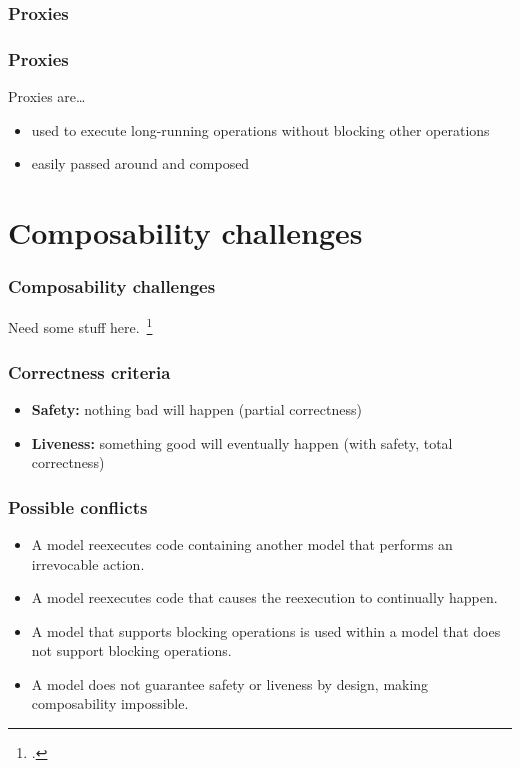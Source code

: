 \documentclass{beamer}
\begin{document}
  \begin{frame}
    \frametitle{Proxies}
  \end{frame}

  \begin{frame}
    \frametitle{Proxies}

    Proxies are\ldots

    \begin{itemize}
      \item used to execute long-running operations without blocking other operations
      \item easily passed around and composed
    \end{itemize}
  \end{frame}

  \section{Composability challenges}

  \begin{frame}
    \frametitle{Composability challenges}
    Need some stuff here.~\footcite{Swalens2014}
  \end{frame}

  \begin{frame}
    \frametitle{Correctness criteria}

    \begin{itemize}
      \item \textbf{Safety:} nothing bad will happen (partial correctness)
      \item \textbf{Liveness:} something good will eventually happen (with safety, total correctness)
    \end{itemize}
  \end{frame}

  \begin{frame}
    \frametitle{Possible conflicts}

    \begin{itemize}
      \item A model reexecutes code containing another model that performs an irrevocable action.
      \item A model reexecutes code that causes the reexecution to continually happen.
      \item A model that supports blocking operations is used within a model that does not support blocking operations.
      \item A model does not guarantee safety or liveness by design, making composability impossible.
    \end{itemize}
  \end{frame}
\end{document}
